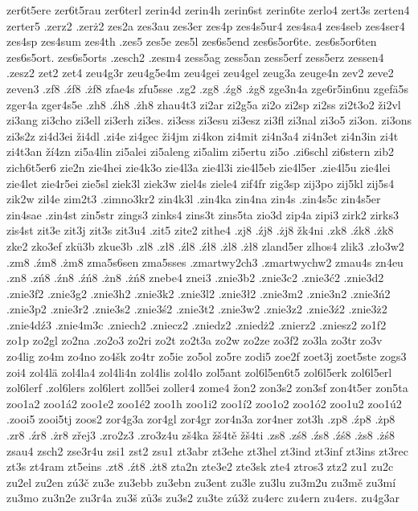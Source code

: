 {{zer6t5ere
zer6t5rau
zer6terl
zerin4d
zerin4h
zerin6st
zerin6te
zerlo4
zert3s
zerten4
zerter5
.zerz2
.zerż2
zes2a
zes3au
zes3er
zes4p
zes4s5ur4
zes4sa4
zes4seb
zes4ser4
zes4sp
zes4sum
zes4th
.zes5
zes5e
zes5l
zes6s5end
zes6s5or6te.
zes6s5or6ten
zes6s5ort.
zes6s5orts
.zesch2
.zesm4
zess5ag
zess5an
zess5erf
zess5erz
zessen4
.zesz2
zet2
zet4
zeu4g3r
zeu4g5e4m
zeu4gei
zeu4gel
zeug3a
zeuge4n
zev2
zeve2
zeven3
.zf8
.źf8
.żf8
zfae4s
zfu5sse
.zg2
.zg8
.źg8
.żg8
zge3n4a
zge6r5in6nu
zgefä5s
zger4a
zger4s5e
.zh8
.źh8
.żh8
zhau4t3
zi2ar
zi2g5a
zi2o
zi2sp
zi2ss
zi2t3o2
ži2vl
zi3ang
zi3cho
zi3ell
zi3erh
zi3es.
zi3ess
zi3esu
zi3esz
zi3fl
zi3nal
zi3o5
zi3on.
zi3ons
zi3s2z
zi4d3ei
ži4dl
.zi4e
zi4gec
ži4jm
zi4kon
zi4mit
zi4n3a4
zi4n3et
zi4n3in
zi4t
zi4t3an
ží4zn
zi5a4lin
zi5alei
zi5aleng
zi5alim
zi5ertu
zi5o
.zi6schl
zi6stern
zib2
zich6t5er6
zie2n
zie4hei
zie4k3o
zie4l3a
zie4l3i
zie4l5eb
zie4l5er
.zie4l5u
zie4lei
zie4let
zie4r5ei
zie5sl
ziek3l
ziek3w
ziel4s
ziele4
zif4fr
zig3sp
zij3po
zij5kl
zij5s4
zik2w
zil4e
zim2t3
.zimno3kr2
zin4k3l
.zin4ka
zin4na
zin4s
.zin4s5c
zin4s5er
zin4sae
.zin4st
zin5str
zings3
zinks4
zins3t
zins5ta
zio3d
zip4a
zipi3
zirk2
zirks3
zis4st
zit3e
zit3j
zit3s
zit3u4
.zit5
zite2
zithe4
.zj8
.źj8
.żj8
žk4ni
.zk8
.źk8
.żk8
zke2
zko3ef
zkü3b
zkue3b
.zl8
.zł8
.źl8
.źł8
.żl8
.żł8
zland5er
zlhos4
zlik3
.zło3w2
.zm8
.źm8
.żm8
zma5s6sen
zma5sses
.zmartwy2ch3
.zmartwychw2
zmau4s
zn4eu
.zn8
.zń8
.źn8
.źń8
.żn8
.żń8
znebe4
znei3
.znie3b2
.znie3c2
.znie3ć2
.znie3d2
.znie3f2
.znie3g2
.znie3h2
.znie3k2
.znie3l2
.znie3ł2
.znie3m2
.znie3n2
.znie3ń2
.znie3p2
.znie3r2
.znie3s2
.znie3ś2
.znie3t2
.znie3w2
.znie3z2
.znie3ź2
.znie3ż2
.znie4dź3
.znie4m3c
.zniech2
.zniecz2
.zniedz2
.zniedż2
.znierz2
.zniesz2
zo1f2
zo1p
zo2gl
zo2na
.zo2o3
zo2ri
zo2t
zo2t3a
zo2w
zo2ze
zo3f2
zo3la
zo3tr
zo3v
zo4lig
zo4m
zo4no
zo4šk
zo4tr
zo5ie
zo5ol
zo5re
zodi5
zoe2f
zoet3j
zoet5ste
zogs3
zoi4
zol4lä
zol4la4
zol4li4n
zol4lis
zol4lo
zol5ant
zol6l5en6t5
zol6l5erk
zol6l5erl
zol6lerf
.zol6lers
zol6lert
zoll5ei
zoller4
zome4
žon2
zon3s2
zon3sf
zon4t5er
zon5ta
zoo1a2
zoo1á2
zoo1e2
zoo1é2
zoo1h
zoo1i2
zoo1í2
zoo1o2
zoo1ó2
zoo1u2
zoo1ú2
.zooi5
zooi5tj
zoos2
zor4g3a
zor4gl
zor4gr
zor4n3a
zor4ner
zot3h
.zp8
.źp8
.żp8
.zr8
.źr8
.żr8
zřej3
.zro2z3
.zro3z4u
zš4ka
žš4tě
žš4ti
.zs8
.zś8
.źs8
.źś8
.żs8
.żś8
zsau4
zsch2
zse3r4u
zsi1
zst2
zsu1
zt3abr
zt3ehe
zt3hel
zt3ind
zt3inf
zt3ins
zt3rec
zt3s
zt4ram
zt5eins
.zt8
.źt8
.żt8
zta2n
zte3e2
zte3sk
zte4
ztros3
ztz2
zu1
zu2c
zu2el
zu2en
zú3č
zu3e
zu3ebb
zu3ebn
zu3ent
zu3le
zu3lu
zu3m2u
zu3mě
zu3mí
zu3mo
zu3n2e
zu3r4a
zu3š
zů3s
zu3s2
zu3te
zú3ž
zu4erc
zu4ern
zu4ers.
zu4g3ar
}}
